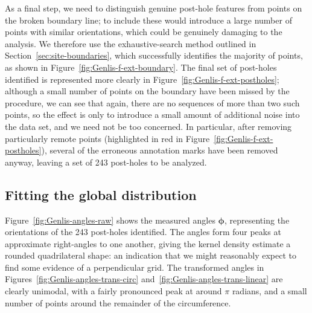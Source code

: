 \documentclass[../../ArchStats.tex]{subfiles}
\begin{document}
As a final step, we need to distinguish genuine post-hole features from points on the broken boundary line; to include these would introduce a large number of points with similar orientations, which could be genuinely damaging to the analysis. We therefore use the exhaustive-search method outlined in Section~\ref{sec:site-boundaries}, which successfully identifies the majority of points, as shown in Figure~\ref{fig:Genlis-f-ext-boundary}. The final set of post-holes identified is represented more clearly in Figure~\ref{fig:Genlis-f-ext-postholes}; although a small number of points on the boundary have been missed by the procedure, we can see that again, there are no sequences of more than two such points, so the effect is only to introduce a small amount of additional noise into the data set, and we need not be too concerned. In particular, after removing particularly remote points (highlighted in red in Figure~\ref{fig:Genlis-f-ext-postholes}), several of the erroneous annotation marks have been removed anyway, leaving a set of 243 post-holes to be analyzed.






\subsection{Fitting the global distribution}

Figure~\ref{fig:Genlis-angles-raw} shows the measured angles $\boldsymbol{\phi}$, representing the orientations of the 243 post-holes identified. The angles form four peaks at approximate right-angles to one another, giving the kernel density estimate a rounded quadrilateral shape: an indication that we might reasonably expect to find some evidence of a perpendicular grid. The transformed angles in Figures~\ref{fig:Genlis-angles-trans-circ} and~\ref{fig:Genlis-angles-trans-linear} are clearly unimodal, with a fairly pronounced peak at around $\pi$ radians, and a small number of points around the remainder of the circumference.
\end{document}
